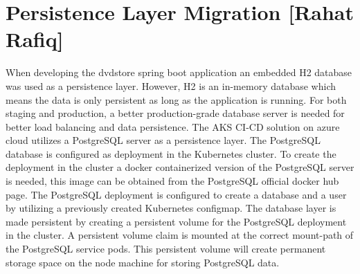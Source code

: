 \section{Persistence Layer Migration [Rahat Rafiq]}\label{sec:persistence_layer_migration}

When developing the dvdstore spring boot application an embedded H2 database was used as a persistence layer. However, H2 is an in-memory database which means the data is only persistent as long as the application is running. For both staging and production, a better production-grade database server is needed for better load balancing and data persistence. The AKS CI-CD solution on azure cloud utilizes a PostgreSQL server as a persistence layer. The PostgreSQL database is configured as deployment in the Kubernetes cluster. To create the deployment in the cluster a docker containerized version of the PostgreSQL server is needed, this image can be obtained from the PostgreSQL official docker hub page. The PostgreSQL deployment is configured to create a database and a user by utilizing a previously created Kubernetes configmap. The database layer is made persistent by creating a persistent volume for the PostgreSQL deployment in the cluster. A persistent volume claim is mounted at the correct mount-path of the PostgreSQL service pods. This persistent volume will create permanent storage space on the node machine for storing PostgreSQL data.      